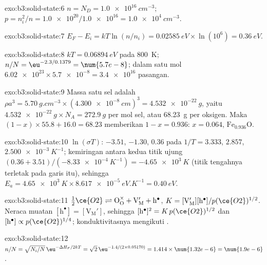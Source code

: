 \begin{solution}{exo:b3:solid-state:6}
$n = N_D = \qty{1.0e16}{cm^{-3}}$; $p = n_i^2/n = \num{1.0e20}/\num{1.0e16} = \qty{1.0e4}{cm^{-3}}$.
\end{solution}

\begin{solution}{exo:b3:solid-state:7}
$E_F - E_i = kT\ln(n/n_i) = \qty{0.02585}{eV} \times \ln(10^6) = \qty{0.36}{eV}$.
\end{solution}

\begin{solution}{exo:b3:solid-state:8}
$kT = \qty{0.06894}{eV}$ pada \qty{800}{K}; $n/N = \eu^{-2.3/0.1379} = \num{5.7e-8}$; dalam satu mol $\num{6.02e23} \times \num{5.7e-8} = \num{3.4e16}$
pasangan.
\end{solution}

\begin{solution}{exo:b3:solid-state:9}
Massa satu sel adalah $\rho a^3 = \qty{5.70}{g.cm^{-3}} \times (\qty{4.300e-8}{cm})^3 = \qty{4.532e-22}{g}$, yaitu
$\qty{4.532e-22}{g} \times N_A = \qty{272.9}{g}$ per mol sel, atau \qty{68.23}{g} per oksigen. Maka
$(1 - x) \times 55.8 + 16.0 = 68.23$ memberikan $1 - x = 0.936$: $x = 0.064$, $\mathrm{Fe_{0.936}O}$.
\end{solution}

\begin{solution}{exo:b3:solid-state:10}
$\ln(\sigma T)$: $-3.51$, $-1.30$, $0.36$ pada $1/T = 3.333$, $2.857$, $\qty{2.500e-3}{K^{-1}}$; kemiringan antara kedua titik ujung
$(0.36 + 3.51)/(-\qty{8.33e-4}{K^{-1}}) = -\qty{4.65e3}{K}$ (titik tengahnya terletak pada garis itu), sehingga
$E_a = \qty{4.65e3}{K} \times \qty{8.617e-5}{eV.K^{-1}} = \qty{0.40}{eV}$.
\end{solution}

\begin{solution}{exo:b3:solid-state:11}
$\tfrac12\ce{O2} \rightleftharpoons \mathrm{O_O^{\times} + V_M' + h^{\bullet}}$, $K = [\mathrm{V_M'}][\mathrm h^\bullet]/p(\ce{O2})^{1/2}$. Neraca muatan $[\mathrm h^\bullet] = [\mathrm{V_M'}]$, sehingga
$[\mathrm h^\bullet]^2 = K\,p(\ce{O2})^{1/2}$ dan $[\mathrm h^\bullet] \propto p(\ce{O2})^{1/4}$; konduktivitasnya mengikuti .
\end{solution}

\begin{solution}{exo:b3:solid-state:12}
$n/N = \sqrt{N_i/N}\,\eu^{-\Delta H_F/2kT} = \sqrt 2\,\eu^{-1.4/(2 \times 0.05170)} = 1.414 \times \num{1.32e-6} = \num{1.9e-6}$.
\end{solution}

